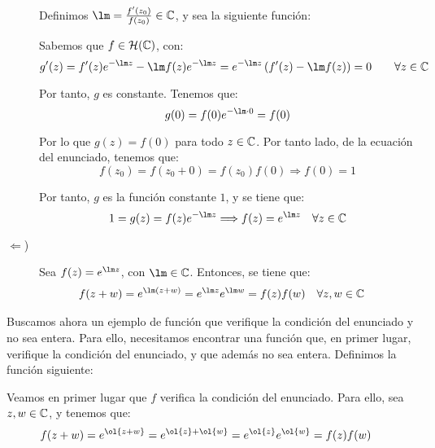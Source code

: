 \begin{ejercicio}
\begin{description}
        Definimos $\lm = \frac{f'(z_0)}{f(z_0)}\in \bb{C}$, y sea la siguiente función:

        Sabemos que $f\in \mathcal{H}(\mathbb{C})$, con:
        \begin{equation*}
            g'(z) = f'(z)e^{-\lm z} - \lm f(z)e^{-\lm z} = e^{-\lm z}\left(f'(z) - \lm f(z)\right) = 0\qquad \forall z\in \bb{C}
        \end{equation*}

        Por tanto, $g$ es constante. Tenemos que:
        \begin{equation*}
            g(0)=f(0)e^{-\lm\cdot 0} = f(0)
        \end{equation*}
        
        Por lo que $g(z) = f(0)$ para todo $z\in \mathbb{C}$. Por tanto lado, de la ecuación del enunciado, tenemos que:
        \begin{equation*}
            f(z_0)=f(z_0+0)=f(z_0)f(0) \Longrightarrow f(0)=1
        \end{equation*}

        Por tanto, $g$ es la función constante $1$, y se tiene que:
        \begin{equation*}
            1=g(z) = f(z)e^{-\lm z} \Longrightarrow f(z) = e^{\lm z} \quad \forall z\in \bb{C}
        \end{equation*}

        \item[$\Longleftarrow$)] Sea $f(z) = e^{\lm z}$, con $\lm \in \bb{C}$. Entonces, se tiene que:
        \begin{align*}
            f(z+w) &= e^{\lm(z+w)} = e^{\lm z}e^{\lm w} = f(z)f(w) \quad \forall z,w\in \bb{C}
        \end{align*}
    \end{description}

    Buscamos ahora un ejemplo de función que verifique la condición del enunciado y no sea entera. Para ello, necesitamos encontrar una función que, en primer lugar, verifique la condición del enunciado, y que además no sea entera.
    Definimos la función siguiente:

    Veamos en primer lugar que $f$ verifica la condición del enunciado. Para ello, sea $z,w\in \mathbb{C}$, y tenemos que:
    \begin{align*}
        f(z+w) &= e^{\ol{z+w}} = e^{\ol{z}+\ol{w}} = e^{\ol{z}}e^{\ol{w}} = f(z)f(w)
    \end{align*}


\end{ejercicio}
